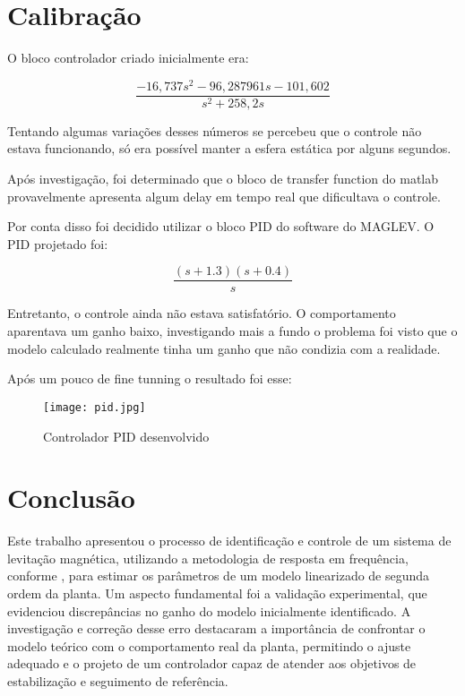 \documentclass[conference,harvard,brazil,english]{sbatex}
\begin{document}
\section{Calibração}
O bloco controlador criado inicialmente era:

\begin{equation}
    \frac{-16,737s^2 -96,287961s -101,602}{s^2+258,2s}
\end{equation}

Tentando algumas variações desses números se percebeu que o controle não estava funcionando, só era possível manter a esfera estática por alguns segundos.

Após investigação, foi determinado que o bloco de transfer function do matlab provavelmente apresenta algum delay em tempo real que dificultava o controle.

Por conta disso foi decidido utilizar o bloco PID do software do MAGLEV. O PID projetado foi:

\begin{equation}
    \frac{(s+1.3)(s+0.4)}{s}
\end{equation}

Entretanto, o controle ainda não estava satisfatório. O comportamento aparentava um ganho baixo, investigando mais a fundo o problema foi visto que o modelo calculado realmente tinha um ganho que não condizia com a realidade.

Após um pouco de fine tunning o resultado foi esse:

\begin{figure}[htbp] %
        \centering %
        \texttt{[image: pid.jpg]}
        \caption{Controlador PID desenvolvido}
        \label{fig:myimage} %
    \end{figure}

\section{Conclusão} 

Este trabalho apresentou o processo de identificação e controle de um sistema de levitação magnética, utilizando a metodologia de resposta em frequência, conforme \cite{kawakami2003}, para estimar os parâmetros de um modelo linearizado de segunda ordem da planta. Um aspecto fundamental foi a validação experimental, que evidenciou discrepâncias no ganho do modelo inicialmente identificado. A investigação e correção desse erro destacaram a importância de confrontar o modelo teórico com o comportamento real da planta, permitindo o ajuste adequado e o projeto de um controlador capaz de atender aos objetivos de estabilização e seguimento de referência.
\end{document}
